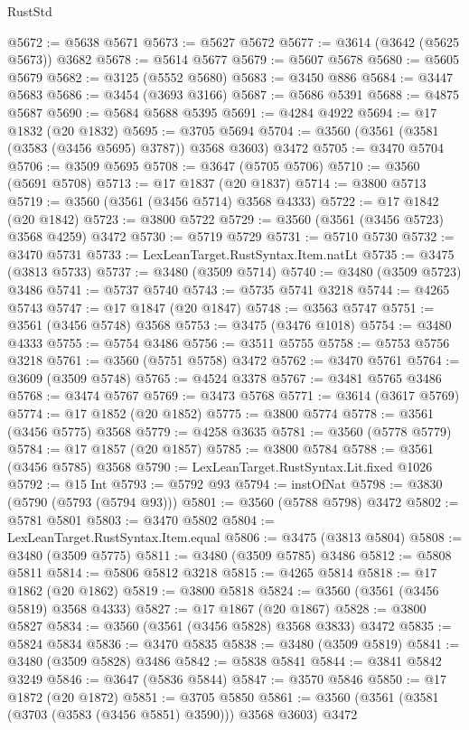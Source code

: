 \begin{lexlean}{RustStd}
\begin{coremodule}
@5672 := @5638 @5671
@5673 := @5627 @5672
@5677 := @3614 (@3642 (@5625 @5673)) @3682
@5678 := @5614 @5677
@5679 := @5607 @5678
@5680 := @5605 @5679
@5682 := @3125 (@5552 @5680)
@5683 := @3450 @886
@5684 := @3447 @5683
@5686 := @3454 (@3693 @3166)
@5687 := @5686 @5391
@5688 := @4875 @5687
@5690 := @5684 @5688 @5395
@5691 := @4284 @4922
@5694 := @17 @1832 (@20 @1832)
@5695 := @3705 @5694
@5704 := @3560 (@3561 (@3581 (@3583 (@3456 @5695) @3787)) @3568 @3603) @3472
@5705 := @3470 @5704
@5706 := @3509 @5695
@5708 := @3647 (@5705 @5706)
@5710 := @3560 (@5691 @5708)
@5713 := @17 @1837 (@20 @1837)
@5714 := @3800 @5713
@5719 := @3560 (@3561 (@3456 @5714) @3568 @4333)
@5722 := @17 @1842 (@20 @1842)
@5723 := @3800 @5722
@5729 := @3560 (@3561 (@3456 @5723) @3568 @4259) @3472
@5730 := @5719 @5729
@5731 := @5710 @5730
@5732 := @3470 @5731
@5733 := LexLeanTarget.RustSyntax.Item.natLt
@5735 := @3475 (@3813 @5733)
@5737 := @3480 (@3509 @5714)
@5740 := @3480 (@3509 @5723) @3486
@5741 := @5737 @5740
@5743 := @5735 @5741 @3218
@5744 := @4265 @5743
@5747 := @17 @1847 (@20 @1847)
@5748 := @3563 @5747
@5751 := @3561 (@3456 @5748) @3568
@5753 := @3475 (@3476 @1018)
@5754 := @3480 @4333
@5755 := @5754 @3486
@5756 := @3511 @5755
@5758 := @5753 @5756 @3218
@5761 := @3560 (@5751 @5758) @3472
@5762 := @3470 @5761
@5764 := @3609 (@3509 @5748)
@5765 := @4524 @3378
@5767 := @3481 @5765 @3486
@5768 := @3474 @5767
@5769 := @3473 @5768
@5771 := @3614 (@3617 @5769)
@5774 := @17 @1852 (@20 @1852)
@5775 := @3800 @5774
@5778 := @3561 (@3456 @5775) @3568
@5779 := @4258 @3635
@5781 := @3560 (@5778 @5779)
@5784 := @17 @1857 (@20 @1857)
@5785 := @3800 @5784
@5788 := @3561 (@3456 @5785) @3568
@5790 := LexLeanTarget.RustSyntax.Lit.fixed @1026
@5792 := @15 Int
@5793 := @5792 @93
@5794 := instOfNat
@5798 := @3830 (@5790 (@5793 (@5794 @93)))
@5801 := @3560 (@5788 @5798) @3472
@5802 := @5781 @5801
@5803 := @3470 @5802
@5804 := LexLeanTarget.RustSyntax.Item.equal
@5806 := @3475 (@3813 @5804)
@5808 := @3480 (@3509 @5775)
@5811 := @3480 (@3509 @5785) @3486
@5812 := @5808 @5811
@5814 := @5806 @5812 @3218
@5815 := @4265 @5814
@5818 := @17 @1862 (@20 @1862)
@5819 := @3800 @5818
@5824 := @3560 (@3561 (@3456 @5819) @3568 @4333)
@5827 := @17 @1867 (@20 @1867)
@5828 := @3800 @5827
@5834 := @3560 (@3561 (@3456 @5828) @3568 @3833) @3472
@5835 := @5824 @5834
@5836 := @3470 @5835
@5838 := @3480 (@3509 @5819)
@5841 := @3480 (@3509 @5828) @3486
@5842 := @5838 @5841
@5844 := @3841 @5842 @3249
@5846 := @3647 (@5836 @5844)
@5847 := @3570 @5846
@5850 := @17 @1872 (@20 @1872)
@5851 := @3705 @5850
@5861 := @3560 (@3561 (@3581 (@3703 (@3583 (@3456 @5851) @3590))) @3568 @3603) @3472

\end{coremodule}
\end{lexlean}
